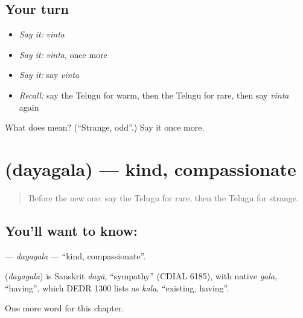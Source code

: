 \subsection*{Your turn}
\begin{itemize}
\raggedright
  \item \emph{Say it:} \emph{vinta}
  \item \emph{Say it:} \emph{vinta}, once more
  \item \emph{Say it:} say \emph{vinta}
  \item \emph{Recall:} say the Telugu for warm, then the Telugu for rare, then say \emph{vinta} again
\end{itemize}

\begin{tcolorbox}[breakable,colback=teal!4,colframe=teal!35!black,title={Before you move on}]
What does  mean? (\textquotedblleft{}Strange, odd\textquotedblright{}.) Say it once more.
\end{tcolorbox}
\section[\texorpdfstring{\te{దయగల} (dayagala)}{దయగల (dayagala)}]{ (dayagala) — kind, compassionate}

\label{lesson:TE-C260-dayagala}



\begin{quote}
Before the new one: say the Telugu for rare, then the Telugu for strange.
\end{quote}

\subsection*{You'll want to know: }
\textbf{} — \emph{dayagala} — \textquotedblleft{}kind, compassionate\textquotedblright{}.

\begin{cousinweb}
\textbf{} (\emph{dayagala}) is Sanskrit \emph{dayā}, \textquotedblleft{}sympathy\textquotedblright{} (CDIAL 6185), with native \emph{gala}, \textquotedblleft{}having\textquotedblright{}, which DEDR 1300 lists as \emph{kala}, \textquotedblleft{}existing, having\textquotedblright{}.
\end{cousinweb}

\begin{grammarlens}[title={What you've built}]
One more word for this chapter.
\end{grammarlens}

